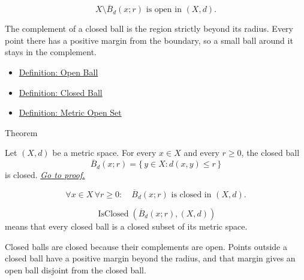 \begin{remark*}
\[
X\setminus \overline{B}_d(x;r)
\text{ is open in }(X,d).
\]
\end{remark*}

\begin{remark*}[Interpretation]
The complement of a closed ball is the region strictly beyond its radius.
Every point there has a positive margin from the boundary, so a small ball
around it stays in the complement.
\end{remark*}

\begin{dependencies}
\begin{itemize}
  \item \hyperref[def:metric-open-ball]{Definition: Open Ball}
  \item \hyperref[def:metric-closed-ball]{Definition: Closed Ball}
  \item \hyperref[def:metric-open-set]{Definition: Metric Open Set}
\end{itemize}
\end{dependencies}

\begin{theorembox}{Theorem}
\begin{theorem}\label{thm:metric-closed-balls-are-closed}
Let \((X,d)\) be a metric space.  For every \(x\in X\) and every \(r\geq 0\),
the closed ball
\[
  \overline{B}_d(x;r)=\{\,y\in X:d(x,y)\leq r\,\}
\]
is closed.
\hyperref[prf:metric-closed-balls-are-closed]{\textit{Go to proof.}}
\end{theorem}
\end{theorembox}

\begin{remark*}
\[
\forall x\in X\,\forall r\geq 0{:}\quad
\overline{B}_d(x;r)\text{ is closed in }(X,d).
\]
\end{remark*}

\begin{remark*}
\[
\operatorname{IsClosed}(\overline{B}_d(x;r),(X,d))
\]
means that every closed ball is a closed subset of its metric space.
\end{remark*}

\begin{remark*}[Interpretation]
Closed balls are closed because their complements are open.  Points outside a
closed ball have a positive margin beyond the radius, and that margin gives an
open ball disjoint from the closed ball.
\end{remark*}

